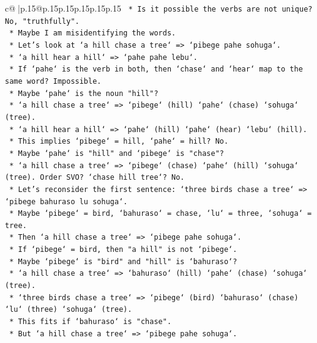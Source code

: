 \documentclass{article}
\begin{document}
{\begin{supertabular}{c@{$\;$}|p{.15\linewidth}@{}p{.15\linewidth}p{.15\linewidth}p{.15\linewidth}p{.15\linewidth}p{.15\linewidth}}
{{{\texttt{            *   Is it possible the verbs are not unique? No, "truthfully".} \\
\texttt{            *   Maybe I am misidentifying the words.} \\
\texttt{            *   Let's look at `a hill chase a tree` => `pibege pahe sohuga`.} \\
\texttt{            *   `a hill hear a hill` => `pahe pahe lebu`.} \\
\texttt{            *   If `pahe` is the verb in both, then `chase` and `hear` map to the same word? Impossible.} \\
\texttt{            *   Maybe `pahe` is the noun "hill"?} \\
\texttt{            *   `a hill chase a tree` => `pibege` (hill) `pahe` (chase) `sohuga` (tree).} \\
\texttt{            *   `a hill hear a hill` => `pahe` (hill) `pahe` (hear) `lebu` (hill).} \\
\texttt{            *   This implies `pibege` = hill, `pahe` = hill? No.} \\
\texttt{            *   Maybe `pahe` is "hill" and `pibege` is "chase"?} \\
\texttt{            *   `a hill chase a tree` => `pibege` (chase) `pahe` (hill) `sohuga` (tree). Order SVO? `chase hill tree`? No.} \\
\texttt{            *   Let's reconsider the first sentence: `three birds chase a tree` => `pibege bahuraso lu sohuga`.} \\
\texttt{            *   Maybe `pibege` = bird, `bahuraso` = chase, `lu` = three, `sohuga` = tree.} \\
\texttt{            *   Then `a hill chase a tree` => `pibege pahe sohuga`.} \\
\texttt{            *   If `pibege` = bird, then "a hill" is not `pibege`.} \\
\texttt{            *   Maybe `pibege` is "bird" and "hill" is `bahuraso`?} \\
\texttt{            *   `a hill chase a tree` => `bahuraso` (hill) `pahe` (chase) `sohuga` (tree).} \\
\texttt{            *   `three birds chase a tree` => `pibege` (bird) `bahuraso` (chase) `lu` (three) `sohuga` (tree).} \\
\texttt{            *   This fits if `bahuraso` is "chase".} \\
\texttt{            *   But `a hill chase a tree` => `pibege pahe sohuga`.} \\
}}}
\end{supertabular}}
\end{document}
